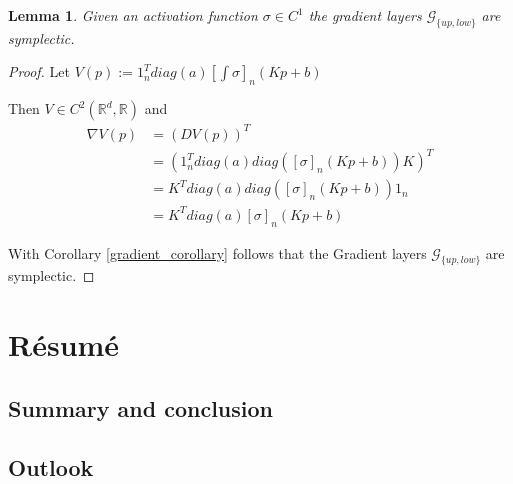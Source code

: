 \documentclass[twoside,a4paper]{article}
\begin{document}
\newtheorem*{glayer}{Lemma}
\begin{glayer}
	Given an activation function $\sigma \in C^1$ the gradient layers $\mathcal{G}_{\{up,low\}}$ 
	are symplectic.
\end{glayer}
\begin{proof}
	Let $V(p) := 1_n^Tdiag(a)[\int \sigma]_n(Kp+b)$ 

	Then $V \in C^2(\mathbb{R}^d, \mathbb{R})$ and
	\begin{align*}
		\nabla V(p) &= \left(DV(p)\right)^T \\
		&= \left(1_n^Tdiag(a)diag\left([\sigma]_n(Kp+b)\right)K\right)^T \\
		&= K^Tdiag(a)diag\left([\sigma]_n(Kp+b)\right)1_n \\
		&= K^Tdiag(a)[\sigma]_n(Kp+b)
	\end{align*}

	With Corollary \ref{gradient_corollary} follows that the Gradient layers $\mathcal{G}_{\{up,low\}}$
	are symplectic. 
\end{proof}


%
%
\clearpage\newpage\null %
\newpage
\section{R\'esum\'e}
\subsection{Summary and conclusion}

\subsection{Outlook}
\end{document}
